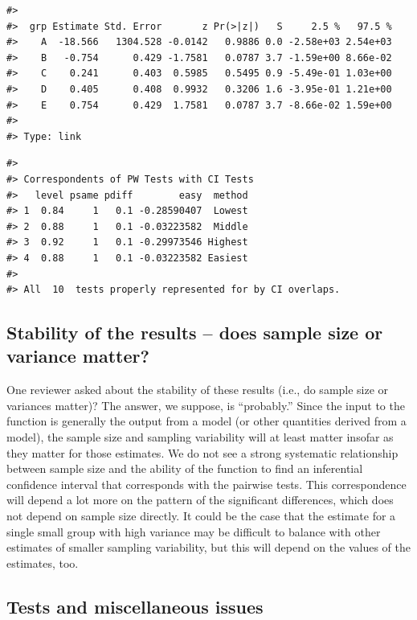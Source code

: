\begin{verbatim}
#> 
#>  grp Estimate Std. Error       z Pr(>|z|)   S     2.5 %   97.5 %
#>    A  -18.566   1304.528 -0.0142   0.9886 0.0 -2.58e+03 2.54e+03
#>    B   -0.754      0.429 -1.7581   0.0787 3.7 -1.59e+00 8.66e-02
#>    C    0.241      0.403  0.5985   0.5495 0.9 -5.49e-01 1.03e+00
#>    D    0.405      0.408  0.9932   0.3206 1.6 -3.95e-01 1.21e+00
#>    E    0.754      0.429  1.7581   0.0787 3.7 -8.66e-02 1.59e+00
#> 
#> Type: link
\end{verbatim}

\begin{verbatim}
#> 
#> Correspondents of PW Tests with CI Tests
#>   level psame pdiff        easy  method
#> 1  0.84     1   0.1 -0.28590407  Lowest
#> 2  0.88     1   0.1 -0.03223582  Middle
#> 3  0.92     1   0.1 -0.29973546 Highest
#> 4  0.88     1   0.1 -0.03223582 Easiest
#> 
#> All  10  tests properly represented for by CI overlaps.
\end{verbatim}

\subsection{Stability of the results -- does sample size or variance matter?}\label{stability-of-the-results-does-sample-size-or-variance-matter}

One reviewer asked about the stability of these results (i.e., do sample size or variances matter)? The answer, we suppose, is ``probably.'' Since the input to the function is generally the output from a model (or other quantities derived from a model), the sample size and sampling variability will at least matter insofar as they matter for those estimates. We do not see a strong systematic relationship between sample size and the ability of the function to find an inferential confidence interval that corresponds with the pairwise tests. This correspondence will depend a lot more on the pattern of the significant differences, which does not depend on sample size directly. It could be the case that the estimate for a single small group with high variance may be difficult to balance with other estimates of smaller sampling variability, but this will depend on the values of the estimates, too.

\subsection{Tests and miscellaneous issues}\label{tests-and-miscellaneous-issues}

